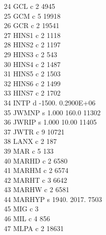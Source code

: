 \documentclass[12pt]{article}
\begin{document}
      24  GCL        c                                  2      4945\\
      25  GCM        c                                  5     19918\\
      26  GCR        c                                  2     19541\\
      27  HINS1      c                                  2      1118\\
      28  HINS2      c                                  2      1197\\
      29  HINS3      c                                  2       543\\
      30  HINS4      c                                  2      1487\\
      31  HINS5      c                                  2      1503\\
      32  HINS6      c                                  2      1499\\
      33  HINS7      c                                  2      1702\\
      34  INTP       d   -1500.       0.2900E+06\\
      35  JWMNP      s    1.000        160.0                  11302\\
      36  JWRIP      s    1.000        10.00                  11405\\
      37  JWTR       c                                  9     10721\\
      38  LANX       c                                  2       187\\
      39  MAR        c                                  5       133\\
      40  MARHD      c                                  2      6580\\
      41  MARHM      c                                  2      6574\\
      42  MARHT      c                                  3      6642\\
      43  MARHW      c                                  2      6581\\
      44  MARHYP     s    1940.        2017.                   7503\\
      45  MIG        c                                  3\\
      46  MIL        c                                  4       856\\
      47  MLPA       c                                  2     18631\\
\end{document}
